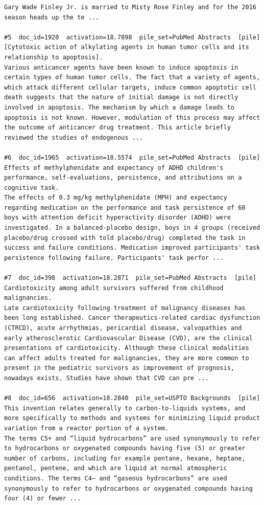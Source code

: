 \begin{verbatim}
Gary Wade Finley Jr. is married to Misty Rose Finley and for the 2016 season heads up the te ...

#5  doc_id=1920  activation=18.7898  pile_set=PubMed Abstracts  [pile]
[Cytotoxic action of alkylating agents in human tumor cells and its relationship to apoptosis].
Various anticancer agents have been known to induce apoptosis in certain types of human tumor cells. The fact that a variety of agents, which attack different cellular targets, induce common apoptotic cell death suggests that the nature of initial damage is not directly involved in apoptosis. The mechanism by which a damage leads to apoptosis is not known. However, modulation of this process may affect the outcome of anticancer drug treatment. This article briefly reviewed the studies of endogenous ...

#6  doc_id=1965  activation=18.5574  pile_set=PubMed Abstracts  [pile]
Effects of methylphenidate and expectancy of ADHD children's performance, self-evaluations, persistence, and attributions on a cognitive task.
The effects of 0.3 mg/kg methylphenidate (MPH) and expectancy regarding medication on the performance and task persistence of 60 boys with attention deficit hyperactivity disorder (ADHD) were investigated. In a balanced-placebo design, boys in 4 groups (received placebo/drug crossed with told placebo/drug) completed the task in success and failure conditions. Medication improved participants' task persistence following failure. Participants' task perfor ...

#7  doc_id=398  activation=18.2871  pile_set=PubMed Abstracts  [pile]
Cardiotoxicity among adult survivors suffered from childhood malignancies.
Late cardiotoxicity following treatment of malignancy diseases has been long established. Cancer therapeutics-related cardiac dysfunction (CTRCD), acute arrhythmias, pericardial disease, valvopathies and early atherosclerotic Cardiovascular Disease (CVD), are the clinical presentations of cardiotoxicity. Although these clinical modalities can affect adults treated for malignancies, they are more common to present in the pediatric survivors as improvement of prognosis, nowadays exists. Studies have shown that CVD can pre ...

#8  doc_id=656  activation=18.2840  pile_set=USPTO Backgrounds  [pile]
This invention relates generally to carbon-to-liquids systems, and more specifically to methods and systems for minimizing liquid product variation from a reactor portion of a system.
The terms C5+ and “liquid hydrocarbons” are used synonymously to refer to hydrocarbons or oxygenated compounds having five (5) or greater number of carbons, including for example pentane, hexane, heptane, pentanol, pentene, and which are liquid at normal atmospheric conditions. The terms C4− and “gaseous hydrocarbons” are used synonymously to refer to hydrocarbons or oxygenated compounds having four (4) or fewer ...


\end{verbatim}
